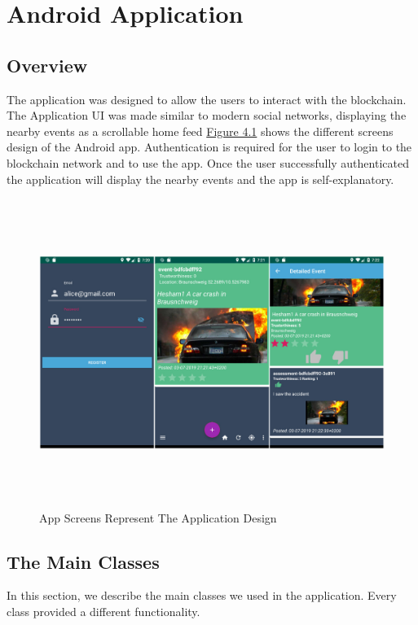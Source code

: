 \chapter{Android Application}
\section {Overview}
The application was designed to allow the users to interact with the blockchain. The Application UI was made similar to modern social networks, displaying the nearby events as a scrollable home feed \hyperref[fig:appscreens]{Figure 4.1} shows the different screens design of the Android app.  Authentication is required for the user to login to the blockchain network and to use the app. Once the user successfully authenticated the application will display the nearby events and the app is self-explanatory.

 \begin{figure}[H]
\includegraphics[width=15cm,height=10cm]{images/appscreens.jpg}
\caption{App Screens Represent The Application Design}
\label{fig:appscreens}
\end{figure}
 
\section{The Main Classes} 

In this section, we describe the main classes we used in the application. Every class provided a different functionality.
